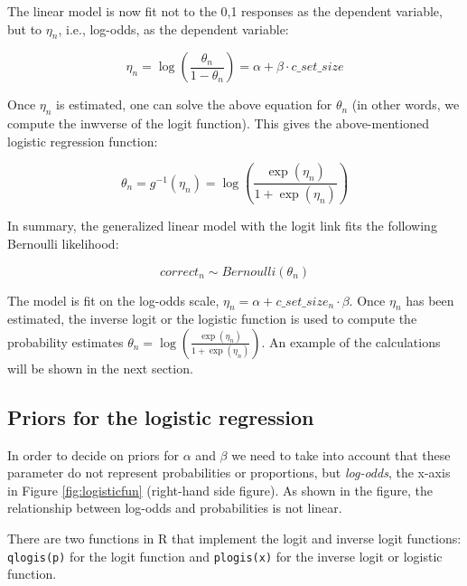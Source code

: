\documentclass[12pt,]{krantz}
\theoremstyle{definition}
\theoremstyle{definition}
\theoremstyle{definition}
\theoremstyle{remark}
\begin{document}
The linear model is now fit not to the 0,1 responses as the dependent variable, but to \(\eta_n\), i.e., log-odds, as the dependent variable:

\begin{equation}
\eta_n = \log\left(\frac{\theta_n}{1-\theta_n}\right) = \alpha + \beta \cdot c\_set\_size
\end{equation}

Once \(\eta_n\) is estimated, one can solve the above equation for \(\theta_n\) (in other words, we compute the inwverse of the logit function). This gives the above-mentioned logistic regression function:

\begin{equation}
\theta_n = g^{-1}(\eta_n) =  \log\left(\frac{\exp(\eta_n)}{1+\exp(\eta_n)}\right)
\end{equation}

In summary, the generalized linear model with the logit link fits the following Bernoulli likelihood:

\begin{equation}
correct_n \sim Bernoulli(\theta_n)
\label{eq:bernoullilogislik}
\end{equation}

The model is fit on the log-odds scale, \(\eta_n = \alpha + c\_set\_size_n \cdot \beta\).
Once \(\eta_n\) has been estimated, the inverse logit or the logistic function is used to compute the probability estimates
\(\theta_n = \log(\frac{\exp(\eta_n)}{1+\exp(\eta_n)})\). An example of the calculations will be shown in the next section.

\hypertarget{priors-for-the-logistic-regression}{%
\subsection{Priors for the logistic regression}\label{priors-for-the-logistic-regression}}

In order to decide on priors for \(\alpha\) and \(\beta\) we need to take into account that these parameter do not represent probabilities or proportions, but \emph{log-odds}, the x-axis in Figure \ref{fig:logisticfun} (right-hand side figure). As shown in the figure, the relationship between log-odds and probabilities is not linear.

There are two functions in R that implement the logit and inverse logit functions: \texttt{qlogis(p)} for the logit function and \texttt{plogis(x)} for the inverse logit or logistic function.
\end{document}
